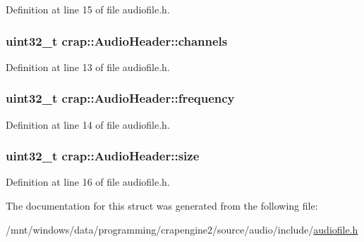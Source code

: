 Definition at line 15 of file audiofile.\+h.

\hypertarget{structcrap_1_1_audio_header_acce2baa85f0c4f92b05f0c7c5c831835}{}
\subsubsection[{channels}]{\setlength{\rightskip}{0pt plus 5cm}uint32\+\_\+t crap\+::\+Audio\+Header\+::channels}\label{structcrap_1_1_audio_header_acce2baa85f0c4f92b05f0c7c5c831835}


Definition at line 13 of file audiofile.\+h.

\hypertarget{structcrap_1_1_audio_header_a4e84b055b61332538db96e156cc13fe6}{}
\subsubsection[{frequency}]{\setlength{\rightskip}{0pt plus 5cm}uint32\+\_\+t crap\+::\+Audio\+Header\+::frequency}\label{structcrap_1_1_audio_header_a4e84b055b61332538db96e156cc13fe6}


Definition at line 14 of file audiofile.\+h.

\hypertarget{structcrap_1_1_audio_header_abb74cac78b291b8f8548566db8aa1112}{}
\subsubsection[{size}]{\setlength{\rightskip}{0pt plus 5cm}uint32\+\_\+t crap\+::\+Audio\+Header\+::size}\label{structcrap_1_1_audio_header_abb74cac78b291b8f8548566db8aa1112}


Definition at line 16 of file audiofile.\+h.



The documentation for this struct was generated from the following file\+:\begin{DoxyCompactItemize}
\item 
/mnt/windows/data/programming/crapengine2/source/audio/include/\hyperlink{audiofile_8h}{audiofile.\+h}\end{DoxyCompactItemize}
